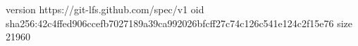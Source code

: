 version https://git-lfs.github.com/spec/v1
oid sha256:42c4ffed906ccefb7027189a39ca992026bfcff27c74c126c541e124c2f15e76
size 21960
